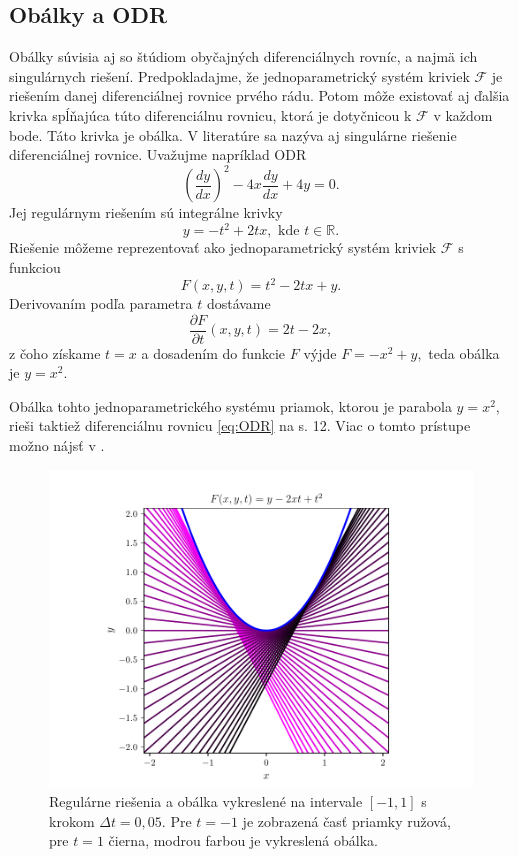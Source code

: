 \subsection{Obálky a ODR}
Obálky súvisia aj so štúdiom obyčajných diferenciálnych rovníc, a najmä ich singulárnych riešení. Predpokladajme, že jednoparametrický systém kriviek $\mathcal{F}$ je riešením danej diferenciálnej rovnice prvého rádu. Potom môže existovať aj ďalšia krivka spĺňajúca túto diferenciálnu rovnicu, ktorá je dotyčnicou k $\mathcal{F}$ v každom bode. Táto krivka je obálka. V literatúre sa nazýva aj singulárne riešenie diferenciálnej rovnice.
Uvažujme napríklad ODR 
\begin{equation}
\label{eq:ODR}
\left(\frac{dy}{dx}\right)^2 - 4x\frac{dy}{dx} + 4y = 0.
\end{equation}
Jej regulárnym riešením sú integrálne krivky 
$$ y = - t^2 + 2tx, \text{ kde } t \in \mathbb{R}.$$
Riešenie môžeme reprezentovať ako jednoparametrický systém kriviek $\mathcal{F}$ s funkciou
$$F(x,y,t) = t^2 - 2tx + y. $$
Derivovaním podľa parametra $t$ dostávame
$$\dfrac{\partial F}{\partial t} (x,y,t) = 2t - 2x, $$
z čoho získame $t=x$ a dosadením do funkcie $F$ výjde $F=-x^2+y,$ teda obálka je $y=x^2.$

Obálka tohto jednoparametrického systému priamok, ktorou je parabola $y = x^2$, rieši taktiež diferenciálnu rovnicu \ref{eq:ODR} na s. 12. Viac o tomto prístupe možno nájsť v \cite{Gro97}.

\begin{figure}[h]
	\centering
	\includegraphics[trim={0 0.35cm 0 0.85cm},clip]{images/odr.pdf}
	\caption[Regulárne riešenia a obálka.]{Regulárne riešenia a obálka vykreslené na intervale $[-1,1]$ s krokom $\Delta t = 0,05$. Pre $t=-1$ je zobrazená časť priamky ružová, pre $t=1$ čierna, modrou farbou je vykreslená obálka.}
	\label{fig:odr}
\end{figure}

